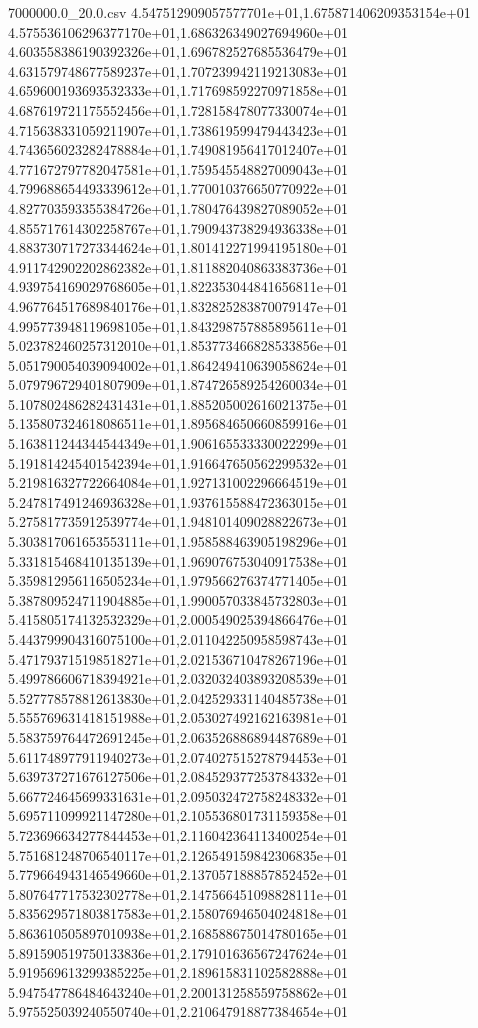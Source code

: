 \begin{filecontents*}{7000000.0_20.0.csv}
4.547512909057577701e+01,1.675871406209353154e+01
4.575536106296377170e+01,1.686326349027694960e+01
4.603558386190392326e+01,1.696782527685536479e+01
4.631579748677589237e+01,1.707239942119213083e+01
4.659600193693532333e+01,1.717698592270971858e+01
4.687619721175552456e+01,1.728158478077330074e+01
4.715638331059211907e+01,1.738619599479443423e+01
4.743656023282478884e+01,1.749081956417012407e+01
4.771672797782047581e+01,1.759545548827009043e+01
4.799688654493339612e+01,1.770010376650770922e+01
4.827703593355384726e+01,1.780476439827089052e+01
4.855717614302258767e+01,1.790943738294936338e+01
4.883730717273344624e+01,1.801412271994195180e+01
4.911742902202862382e+01,1.811882040863383736e+01
4.939754169029768605e+01,1.822353044841656811e+01
4.967764517689840176e+01,1.832825283870079147e+01
4.995773948119698105e+01,1.843298757885895611e+01
5.023782460257312010e+01,1.853773466828533856e+01
5.051790054039094002e+01,1.864249410639058624e+01
5.079796729401807909e+01,1.874726589254260034e+01
5.107802486282431431e+01,1.885205002616021375e+01
5.135807324618086511e+01,1.895684650660859916e+01
5.163811244344544349e+01,1.906165533330022299e+01
5.191814245401542394e+01,1.916647650562299532e+01
5.219816327722664084e+01,1.927131002296664519e+01
5.247817491246936328e+01,1.937615588472363015e+01
5.275817735912539774e+01,1.948101409028822673e+01
5.303817061653553111e+01,1.958588463905198296e+01
5.331815468410135139e+01,1.969076753040917538e+01
5.359812956116505234e+01,1.979566276374771405e+01
5.387809524711904885e+01,1.990057033845732803e+01
5.415805174132532329e+01,2.000549025394866476e+01
5.443799904316075100e+01,2.011042250958598743e+01
5.471793715198518271e+01,2.021536710478267196e+01
5.499786606718394921e+01,2.032032403893208539e+01
5.527778578812613830e+01,2.042529331140485738e+01
5.555769631418151988e+01,2.053027492162163981e+01
5.583759764472691245e+01,2.063526886894487689e+01
5.611748977911940273e+01,2.074027515278794453e+01
5.639737271676127506e+01,2.084529377253784332e+01
5.667724645699331631e+01,2.095032472758248332e+01
5.695711099921147280e+01,2.105536801731159358e+01
5.723696634277844453e+01,2.116042364113400254e+01
5.751681248706540117e+01,2.126549159842306835e+01
5.779664943146549660e+01,2.137057188857852452e+01
5.807647717532302778e+01,2.147566451098828111e+01
5.835629571803817583e+01,2.158076946504024818e+01
5.863610505897010938e+01,2.168588675014780165e+01
5.891590519750133836e+01,2.179101636567247624e+01
5.919569613299385225e+01,2.189615831102582888e+01
5.947547786484643240e+01,2.200131258559758862e+01
5.975525039240550740e+01,2.210647918877384654e+01

\end{filecontents*}
